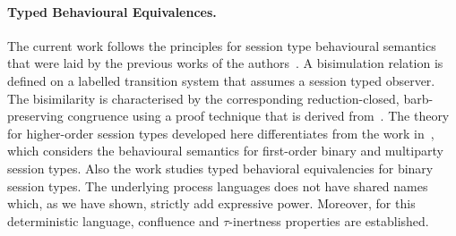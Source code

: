 \paragraph{Typed Behavioural Equivalences.}
The current work follows the principles for
session type behavioural semantics that were laid
by the previous works of the
authors~\cite{dkphdthesis,DBLP:conf/forte/KouzapasYH11,KY13,DBLP:journals/iandc/PerezCPT14}.
A bisimulation relation is defined on a labelled
transition system that assumes a session typed
observer.
The bisimilarity is characterised by the corresponding
reduction-closed, barb-preserving congruence using a
proof technique that is derived from~\cite{Hennessy07}.
The theory for higher-order session types developed here
differentiates from 
the work in~\cite{dkphdthesis,DBLP:conf/forte/KouzapasYH11,KY13}, which 
considers the behavioural semantics for first-order
binary and multiparty session types.
Also the work \cite{DBLP:journals/iandc/PerezCPT14} studies typed behavioral equivalencies for binary session types.
The underlying process languages does not have shared names which, as we have shown, strictly add expressive power. 
Moreover, for this deterministic language, confluence and $\tau$-inertness properties are established.

